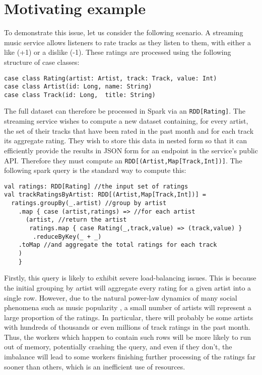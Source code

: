 
\section{Motivating example} {

To demonstrate this issue, let us consider the following scenario. A streaming music service allows listeners to rate tracks as they listen to them, with either a like (+1) or a dislike (-1). These ratings are processed using the following structure of case classes:
\vs\begin{lstlisting}
case class Rating(artist: Artist, track: Track, value: Int)
case class Artist(id: Long, name: String)
case class Track(id: Long,  title: String)
\end{lstlisting}
The full dataset can therefore be processed in Spark via an \lstinline{RDD[Rating]}. The streaming service wishes to compute a new dataset containing, for every artist, the set of their tracks that have been rated in the past month and for each track its aggregate rating. They wish to store this data in nested form so that it can efficiently provide the results in JSON form for an endpoint in the service's public API. Therefore they must compute an \lstinline{RDD[(Artist,Map[Track,Int])]}. The following spark query is the standard way to compute this:
\vs\begin{lstlisting}
val ratings: RDD[Rating] //the input set of ratings
val trackRatingsByArtist: RDD[(Artist,Map[Track,Int])] =
  ratings.groupBy(_.artist) //group by artist
    .map { case (artist,ratings) => //for each artist
      (artist, //return the artist
       ratings.map { case Rating(_,track,value) => (track,value) } 
        .reduceByKey(_ + _)
	.toMap //and aggregate the total ratings for each track
	)
    }
\end{lstlisting}\vs
Firstly, this query is likely to exhibit severe load-balancing issues. This is because the initial grouping by artist will aggregate every rating for a given artist into a single row. However, due to the natural power-law dynamics of many social phenomena such as music popularity \cite{musicpowerlaw}, a small number of artists will represent a large proportion of the ratings. In particular, there will probably be some artists with hundreds of thousands or even millions of track ratings in the past month. Thus, the workers which happen to contain such rows will be more likely to run out of memory, potentially crashing the query, and even if they don't, the imbalance will lead to some workers finishing further processing of the ratings far sooner than others, which is an inefficient use of resources.

}

